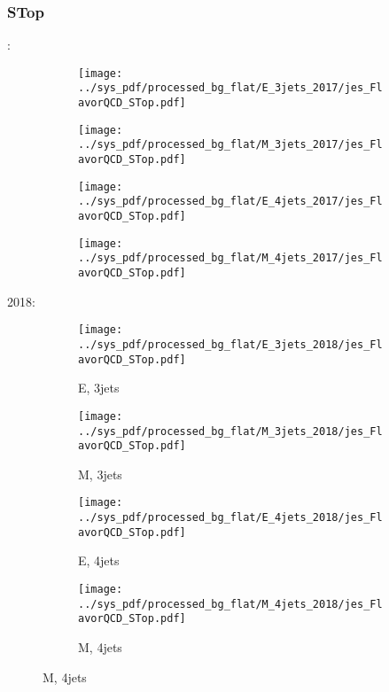 \documentclass{beamer}
\begin{document}
\begin{frame}
\frametitle{STop}
\fontsize{5}{1}:
\begin{figure}
\centering
\begin{subfigure}[b]{0.24\textwidth}
\texttt{[image: ../sys\_pdf/processed\_bg\_flat/E\_3jets\_2017/jes\_FlavorQCD\_STop.pdf]}
\end{subfigure}
\begin{subfigure}[b]{0.24\textwidth}
\texttt{[image: ../sys\_pdf/processed\_bg\_flat/M\_3jets\_2017/jes\_FlavorQCD\_STop.pdf]}
\end{subfigure}
\begin{subfigure}[b]{0.24\textwidth}
\texttt{[image: ../sys\_pdf/processed\_bg\_flat/E\_4jets\_2017/jes\_FlavorQCD\_STop.pdf]}
\end{subfigure}
\begin{subfigure}[b]{0.24\textwidth}
\texttt{[image: ../sys\_pdf/processed\_bg\_flat/M\_4jets\_2017/jes\_FlavorQCD\_STop.pdf]}
\end{subfigure}
\end{figure}
2018:
\begin{figure}
\centering
\begin{subfigure}[b]{0.24\textwidth}
\texttt{[image: ../sys\_pdf/processed\_bg\_flat/E\_3jets\_2018/jes\_FlavorQCD\_STop.pdf]}
\captionsetup{font=tiny}
\caption{E, 3jets}
\end{subfigure}
\begin{subfigure}[b]{0.24\textwidth}
\texttt{[image: ../sys\_pdf/processed\_bg\_flat/M\_3jets\_2018/jes\_FlavorQCD\_STop.pdf]}
\captionsetup{font=tiny}
\caption{M, 3jets}
\end{subfigure}
\begin{subfigure}[b]{0.24\textwidth}
\texttt{[image: ../sys\_pdf/processed\_bg\_flat/E\_4jets\_2018/jes\_FlavorQCD\_STop.pdf]}
\captionsetup{font=tiny}
\caption{E, 4jets}
\end{subfigure}
\begin{subfigure}[b]{0.24\textwidth}
\texttt{[image: ../sys\_pdf/processed\_bg\_flat/M\_4jets\_2018/jes\_FlavorQCD\_STop.pdf]}
\captionsetup{font=tiny}
\caption{M, 4jets}
\end{subfigure}
\end{figure}
\end{frame}
\end{document}
